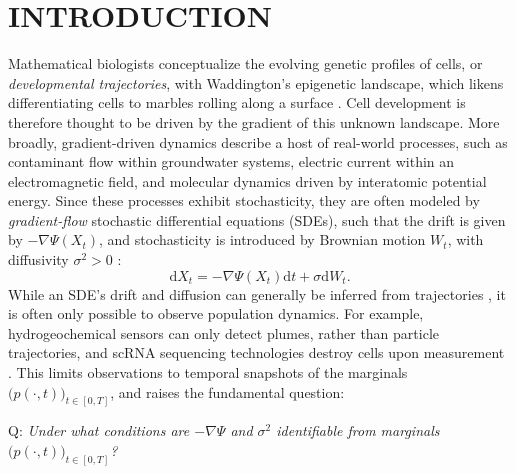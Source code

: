 \documentclass[twoside]{article}
\newcommand{\dXt}{\mathrm{d}X_t}
\newcommand{\dt}{\mathrm{d}t}
\newcommand{\dWt}{\mathrm{d}W_t}
\begin{document}
\section{INTRODUCTION}
Mathematical biologists conceptualize the evolving genetic profiles of cells, or \textit{developmental trajectories}, with Waddington's epigenetic landscape, which likens differentiating cells to marbles rolling along a surface \citep{waddington1935animal}. Cell development is therefore thought to be driven by the gradient of this unknown landscape. More broadly, gradient-driven dynamics  describe a host of real-world processes, such as contaminant flow within groundwater systems, electric current within an electromagnetic field, and molecular dynamics driven by interatomic potential energy. Since these processes exhibit stochasticity, they are often modeled by \emph{gradient-flow} stochastic differential equations (SDEs), such that the drift is given by $-\nabla \Psi(X_t)$, and stochasticity is introduced by Brownian motion $W_t$, with diffusivity $\sigma^2>0$
\citep{weinreb2018fundamental, lavenant2021towards,lelievre2016partial}:
\begin{equation}\label{eq:overdamped_langevin_SDE}
    \dXt{} = -\nabla \Psi(X_t) \dt{} + \sigma \dWt{}.
\end{equation}
 While an SDE's drift and diffusion can generally be inferred from trajectories \citep{nielsen2000parameter, bishwal2007parameter, browning2020identifiability,wang2024generator}, it is often only possible to observe population dynamics. For example, hydrogeochemical sensors can only detect plumes, rather than particle trajectories, and scRNA sequencing technologies destroy cells upon measurement \citep{trapnell2014dynamics}. This limits observations to temporal snapshots of the marginals $\bigl(p(\cdot, t)\bigr)_{t \in [0,T]}$, and raises the fundamental question:
\begin{mdframed}[hidealllines=true,backgroundcolor=gray!8]
\begin{center}
Q: \emph{Under what conditions are $-\nabla\Psi$ and $\sigma^2$ identifiable from marginals $\bigl(p(\cdot, t)\bigr)_{t \in [0,T]}$?}
\end{center}
\end{mdframed}
\end{document}
